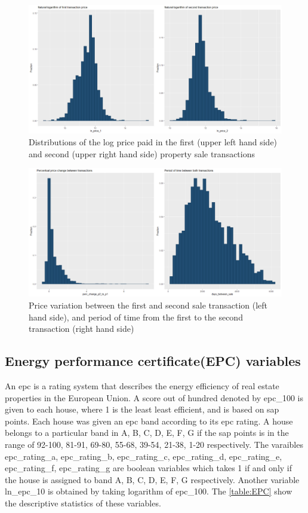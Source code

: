 \documentclass[12pt]{article}
\begin{document}
\begin{figure}[H]
    \centering
    \includegraphics[width=15cm]{ln_price.png}
    \caption{Distributions of the log price paid in the first (upper left hand side) and second (upper right hand side) property sale transactions}
    \label{fig:transactional1}
\end{figure}

\begin{figure}[H]
    \centering
    \includegraphics[width=17cm]{time_change.png}
    \caption{Price variation between the first and second sale transaction (left hand side), and period of time from the first to the second transaction (right hand side)}
    \label{fig:transactional2}
\end{figure}

\subsection{Energy performance certificate(EPC) variables}
An \acrshort{epc} is a rating system that describes the energy efficiency of real estate properties in the European Union. A score out of hundred denoted by epc\_100 is given to each house, where 1 is the least least efficient, and is based on \acrfull{sap} points. Each house was given an \acrshort{epc} band according to its \acrshort{epc} rating. A house belongs to a particular band in A, B, C, D, E, F, G if the \acrshort{sap} points is in the range of 92-100, 81-91, 69-80, 55-68, 39-54, 21-38, 1-20 respectively. The varaibles epc\_rating\_a, epc\_rating\_b, epc\_rating\_c, epc\_rating\_d, epc\_rating\_e, epc\_rating\_f, epc\_rating\_g are boolean variables which takes 1 if and only if the house is assigned to band A, B, C, D, E, F, G respectively. Another variable ln\_epc\_10 is obtained by taking logarithm of epc\_100. The \autoref{table:EPC} show the descriptive statistics of these variables. 
\end{document}
